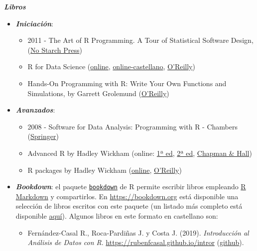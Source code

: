 \documentclass[
]{book}
\providecommand{\tightlist}{%
  \setlength{\itemsep}{0pt}\setlength{\parskip}{0pt}}
\theoremstyle{break}
\theoremstyle{definition}
\theoremstyle{definition}
\theoremstyle{definition}
\theoremstyle{remark}
\begin{document}
\textbf{\emph{Libros}}

\begin{itemize}
\item
  \textbf{\emph{Iniciación}}:

  \begin{itemize}
  \item
    2011 - The Art of R Programming. A Tour of Statistical Software Design,
    (\href{https://www.nostarch.com/artofr.htm}{No Starch Press})
  \item
    R for Data Science
    (\href{http://r4ds.had.co.nz}{online}, \href{https://es.r4ds.hadley.nz}{online-castellano},
    \href{http://shop.oreilly.com/product/0636920034407.do}{O'Reilly})
  \item
    Hands-On Programming with R: Write Your Own Functions and Simulations,
    by Garrett Grolemund
    (\href{http://shop.oreilly.com/product/0636920028574.do}{O'Reilly})
  \end{itemize}
\item
  \textbf{\emph{Avanzados}}:

  \begin{itemize}
  \item
    2008 - Software for Data Analysis: Programming with R - Chambers
    (\href{http://www.springer.com/la/book/9780387759357}{Springer})
  \item
    Advanced R by Hadley Wickham
    (online: \href{http://adv-r.had.co.nz/}{1ª ed},
    \href{https://adv-r.hadley.nz/}{2ª ed},
    \href{https://www.amazon.com/dp/1466586966}{Chapman \& Hall})
  \item
    R packages by Hadley Wickham
    (\href{http://r-pkgs.had.co.nz/}{online},
    \href{http://shop.oreilly.com/product/0636920034421.do}{O'Reilly})
  \end{itemize}
\item
  \textbf{\emph{Bookdown}}:
  el paquete \href{https://bookdown.org}{\texttt{bookdown}} de R permite escribir libros empleando
  \href{http://rmarkdown.rstudio.com}{R Markdown} y compartirlos.
  En \url{https://bookdown.org} está disponible una selección de libros escritos con este paquete
  (un listado más completo está disponible \href{https://bookdown.org/home/archive/}{aquí}).
  Algunos libros en este formato en castellano son:

  \begin{itemize}
  \tightlist
  \item
    Fernández-Casal R., Roca-Pardiñas J. y Costa J. (2019). \emph{Introducción al Análisis de Datos con R}. \url{https://rubenfcasal.github.io/intror} (\href{https://github.com/rubenfcasal/intror}{github}).
  \end{itemize}


\end{itemize}
\end{document}
